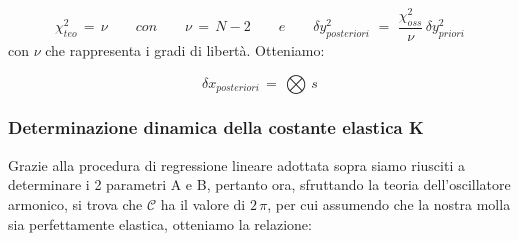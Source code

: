 \begin{equation*}
	\chi_{teo}^2 \,=\, \nu \quad \quad con \quad \quad
	\nu \,=\, N - 2 \quad \quad e \quad \quad
	\delta y_{posteriori}^2 \,\,=\,\, \frac{\chi_{oss}^2}{\nu} \, \delta y_{priori}^2
\end{equation*}
%
con $\nu$ che rappresenta i gradi di libertà. Otteniamo:

\begin{equation*}
	\delta x_{posteriori} \,=\, \bigotimes \,s
\end{equation*}	 

\subsubsection{Determinazione dinamica della costante elastica K}
Grazie alla procedura di regressione lineare adottata sopra siamo riusciti a determinare i 2 parametri A e B, pertanto ora, sfruttando la teoria dell'oscillatore armonico, si trova che $\mathcal{C}$ ha il valore di $2 \, \pi$, per cui assumendo che la nostra molla sia perfettamente elastica, otteniamo la relazione:

